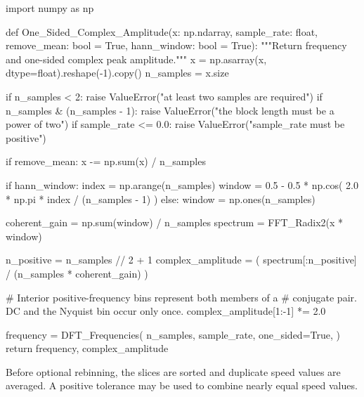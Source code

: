 \begin{python}
import numpy as np


def One_Sided_Complex_Amplitude(x: np.ndarray,
                                sample_rate: float,
                                remove_mean: bool = True,
                                hann_window: bool = True):
    """Return frequency and one-sided complex peak amplitude."""
    x = np.asarray(x, dtype=float).reshape(-1).copy()
    n_samples = x.size

    if n_samples < 2:
        raise ValueError("at least two samples are required")
    if n_samples & (n_samples - 1):
        raise ValueError("the block length must be a power of two")
    if sample_rate <= 0.0:
        raise ValueError("sample_rate must be positive")

    if remove_mean:
        x -= np.sum(x) / n_samples

    if hann_window:
        index = np.arange(n_samples)
        window = 0.5 - 0.5 * np.cos(
            2.0 * np.pi * index / (n_samples - 1)
        )
    else:
        window = np.ones(n_samples)

    coherent_gain = np.sum(window) / n_samples
    spectrum = FFT_Radix2(x * window)

    n_positive = n_samples // 2 + 1
    complex_amplitude = (
        spectrum[:n_positive] / (n_samples * coherent_gain)
    )

    # Interior positive-frequency bins represent both members of a
    # conjugate pair. DC and the Nyquist bin occur only once.
    complex_amplitude[1:-1] *= 2.0

    frequency = DFT_Frequencies(
        n_samples,
        sample_rate,
        one_sided=True,
    )
    return frequency, complex_amplitude
\end{python}

Before optional rebinning, the slices are sorted and duplicate speed values are
averaged. A positive tolerance may be used to combine nearly equal speed values.

